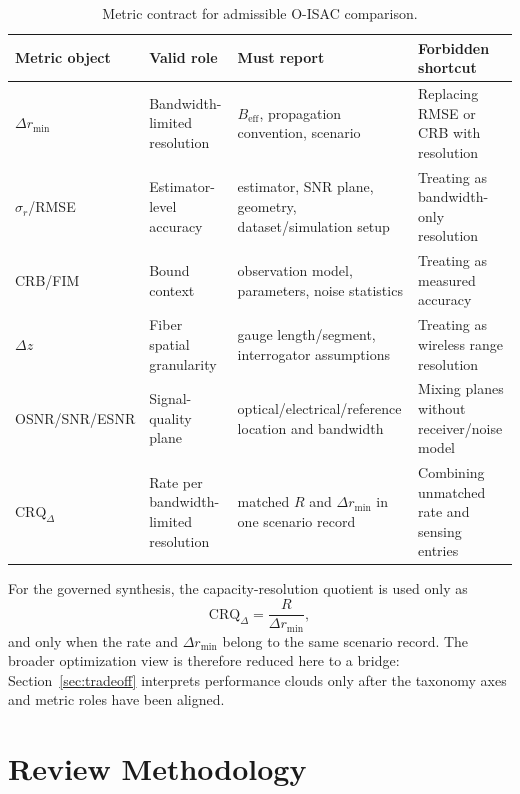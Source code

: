 \documentclass[letterpaper,journal]{IEEEtran}
\begin{document}
\begin{table}[!t]
    \caption{Metric contract for admissible O-ISAC comparison.}
    \label{tab:ii2}
    \centering
    \scriptsize
    \setlength{\tabcolsep}{2.8pt}
    \renewcommand{\arraystretch}{1.08}
    \begin{tabularx}{\textwidth}{@{}p{2.15cm}p{2.15cm}p{2.7cm}X@{}}
        \toprule
        Metric object & Valid role & Must report & Forbidden shortcut \\
        \midrule
        $\Delta r_{\min}$ & Bandwidth-limited resolution & $B_{\mathrm{eff}}$, propagation convention, scenario & Replacing RMSE or CRB with resolution \\
        $\sigma_r$/RMSE & Estimator-level accuracy & estimator, SNR plane, geometry, dataset/simulation setup & Treating as bandwidth-only resolution \\
        CRB/FIM & Bound context & observation model, parameters, noise statistics & Treating as measured accuracy \\
        $\Delta z$ & Fiber spatial granularity & gauge length/segment, interrogator assumptions & Treating as wireless range resolution \\
        OSNR/SNR/ESNR & Signal-quality plane & optical/electrical/reference location and bandwidth & Mixing planes without receiver/noise model \\
        $\mathrm{CRQ}_{\Delta}$ & Rate per bandwidth-limited resolution & matched $R$ and $\Delta r_{\min}$ in one scenario record & Combining unmatched rate and sensing entries \\
        \bottomrule
    \end{tabularx}
\end{table}

For the governed synthesis, the capacity-resolution quotient is used only as
\begin{equation}
    \mathrm{CRQ}_{\Delta}=\frac{R}{\Delta r_{\min}},
    \label{eq:crq_delta}
\end{equation}
and only when the rate and $\Delta r_{\min}$ belong to the same scenario record. The broader optimization view is therefore reduced here to a bridge: Section~\ref{sec:tradeoff} interprets performance clouds only after the taxonomy axes and metric roles have been aligned.

\section{Review Methodology}
\label{sec:methodology}
\end{document}
